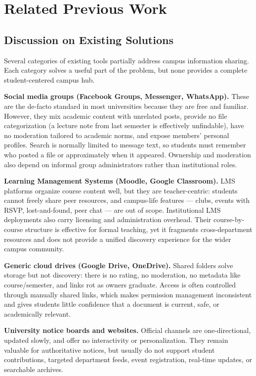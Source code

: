\documentclass[12pt,a4paper]{report}
\begin{document}
\chapter{Related Previous Work}
\section{Discussion on Existing Solutions}
Several categories of existing tools partially address campus
information sharing. Each category solves a useful part of the
problem, but none provides a complete student-centered campus hub.

\textbf{Social media groups (Facebook Groups, Messenger, WhatsApp).}
These are the de-facto standard in most universities because they
are free and familiar. However, they mix academic content with
unrelated posts, provide no file categorization (a lecture note from
last semester is effectively unfindable), have no moderation
tailored to academic norms, and expose members' personal profiles.
Search is normally limited to message text, so students must remember
who posted a file or approximately when it appeared. Ownership and
moderation also depend on informal group administrators rather than
institutional roles.

\textbf{Learning Management Systems (Moodle, Google Classroom).}
LMS platforms organize course content well, but they are
teacher-centric: students cannot freely share peer resources, and
campus-life features --- clubs, events with RSVP, lost-and-found,
peer chat --- are out of scope. Institutional LMS deployments also
carry licensing and administration overhead. Their course-by-course
structure is effective for formal teaching, yet it fragments
cross-department resources and does not provide a unified discovery
experience for the wider campus community.

\textbf{Generic cloud drives (Google Drive, OneDrive).} Shared
folders solve storage but not discovery: there is no rating, no
moderation, no metadata like course/semester, and links rot as
owners graduate. Access is often controlled through manually shared
links, which makes permission management inconsistent and gives
students little confidence that a document is current, safe, or
academically relevant.

\textbf{University notice boards and websites.} Official channels
are one-directional, updated slowly, and offer no interactivity or
personalization. They remain valuable for authoritative notices, but
usually do not support student contributions, targeted department
feeds, event registration, real-time updates, or searchable archives.
\end{document}
